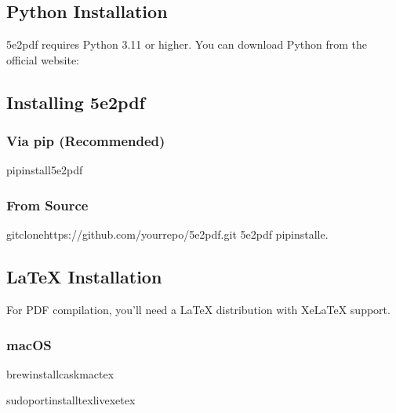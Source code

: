 \documentclass[letterpaper,10pt,english]{sphinxmanual}
\begin{document}
\subsection{Python Installation}
\label{\detokenize{user-guide/installation:python-installation}}
\sphinxAtStartPar
5e2pdf requires Python 3.11 or higher. You can download Python from the official website:

\sphinxAtStartPar
{}


\subsection{Installing 5e2pdf}
\label{\detokenize{user-guide/installation:installing-5e2pdf}}

\subsubsection{Via pip (Recommended)}
\label{\detokenize{user-guide/installation:via-pip-recommended}}
\begin{sphinxVerbatim}[commandchars=\\\{\}]
pipinstall5e2pdf
\end{sphinxVerbatim}


\subsubsection{From Source}
\label{\detokenize{user-guide/installation:from-source}}
\begin{sphinxVerbatim}[commandchars=\\\{\}]
gitclonehttps://github.com/your\PYGZhy{}repo/5e2pdf.git
5e2pdf
pipinstall\PYGZhy{}e.
\end{sphinxVerbatim}


\subsection{LaTeX Installation}
\label{\detokenize{user-guide/installation:latex-installation}}
\sphinxAtStartPar
For PDF compilation, you’ll need a LaTeX distribution with XeLaTeX support.


\subsubsection{macOS}
\label{\detokenize{user-guide/installation:macos}}
\begin{sphinxVerbatim}[commandchars=\\\{\}]
brewinstall\PYGZhy{}\PYGZhy{}caskmactex

sudoportinstalltexlive\PYGZhy{}xetex
\end{sphinxVerbatim}
\end{document}
